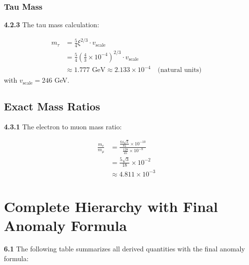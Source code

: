 \documentclass[12pt,a4paper]{article}
\newcommand{\xipar}{\xi}
\begin{document}
	\subsubsection{Tau Mass}
	
	\noindent \textbf{4.2.3} The tau mass calculation:
	\begin{keyresult}
		\begin{align}
			m_\tau &= \frac{5}{4} \xipar^{2/3} \cdot v_{\text{scale}} \\
			&= \frac{5}{4} \left( \frac{4}{3} \times 10^{-4} \right)^{2/3} \cdot v_{\text{scale}} \\
			&\approx 1.777 \text{ GeV} \approx 2.133 \times 10^{-4} \quad \text{(natural units)}
		\end{align}
		with $v_{\text{scale}} = 246$ GeV.
	\end{keyresult}
	
	\subsection{Exact Mass Ratios}
	
	\noindent \textbf{4.3.1} The electron to muon mass ratio:
	\begin{keyresult}
		\begin{align}
			\frac{m_e}{m_\mu} &= \frac{\frac{64 \sqrt{3}}{81} \times 10^{-10}}{\frac{128}{45} \times 10^{-8}} \\
			&= \frac{5 \sqrt{3}}{18} \times 10^{-2} \\
			&\approx 4.811 \times 10^{-3}
		\end{align}
	\end{keyresult}
	



	\section{Complete Hierarchy with Final Anomaly Formula}
	
	\noindent \textbf{6.1} The following table summarizes all derived quantities with the final anomaly formula:
	
\end{document}
